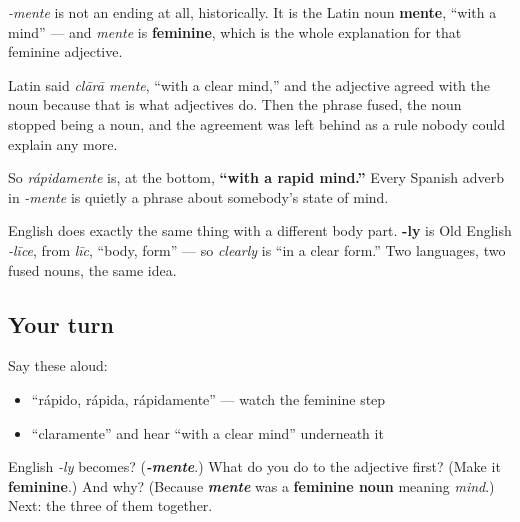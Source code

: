 \begin{cousinweb}
\emph{-mente} is not an ending at all, historically. It is the Latin noun \textbf{mente}, \textquotedblleft{}with a mind\textquotedblright{} — and \emph{mente} is \textbf{feminine}, which is the whole explanation for that feminine adjective.

Latin said \emph{clārā mente}, \textquotedblleft{}with a clear mind,\textquotedblright{} and the adjective agreed with the noun because that is what adjectives do. Then the phrase fused, the noun stopped being a noun, and the agreement was left behind as a rule nobody could explain any more.

So \emph{rápidamente} is, at the bottom, \textbf{\textquotedblleft{}with a rapid mind.\textquotedblright{}} Every Spanish adverb in \emph{-mente} is quietly a phrase about somebody's state of mind.

English does exactly the same thing with a different body part. \textbf{-ly} is Old English \emph{-līce}, from \emph{līc}, \textquotedblleft{}body, form\textquotedblright{} — so \emph{clearly} is \textquotedblleft{}in a clear form.\textquotedblright{} Two languages, two fused nouns, the same idea.
\end{cousinweb}

\subsection*{Your turn}
Say these aloud:

\begin{itemize}
\raggedright
  \item \textquotedblleft{}rápido, rápida, rápidamente\textquotedblright{} — watch the feminine step
  \item \textquotedblleft{}claramente\textquotedblright{} and hear \textquotedblleft{}with a clear mind\textquotedblright{} underneath it
\end{itemize}

\begin{tcolorbox}[breakable,colback=teal!4,colframe=teal!35!black,title={Before you move on}]
English \emph{-ly} becomes? (\emph{\textbf{-mente}}.) What do you do to the adjective first? (Make it \textbf{feminine}.) And why? (Because \emph{\textbf{mente}} was a \textbf{feminine noun} meaning \emph{mind}.) Next: the three of them together.
\end{tcolorbox}
